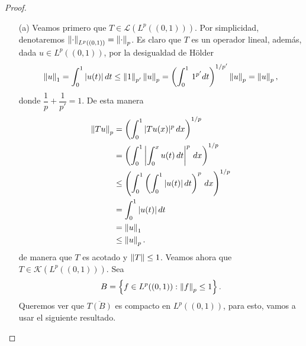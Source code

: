 \begin{proof}
    \begin{enumerate}
        \item[(a)] Veamos primero que $T\in \mathcal{L}(L^p((0,1)))$. Por simplicidad, denotaremos $\left\|\cdot\right\|_{L^p((0,1))}=\left\|\cdot\right\|_p$. Es claro que $T$ es un operador lineal, además, dada $u \in L^p((0,1))$, por la desigualdad de Hölder
        \begin{align*}
            \left\|u\right\|_1=\int_0^1|u(t)|\, dt\leq \left\|1\right\|_{p'}\left\|u\right\|_p=\left(\int_0^1 \, 1^{p'}dt\right)^{1/p'}\left\|u\right\|_p=\left\|u\right\|_p,
        \end{align*}
        donde $\dfrac{1}{p}+\dfrac{1}{p'}=1$. De esta manera
        \begin{align*}
            \left\|Tu\right\|_p&=\left(\int_{0}^1 |Tu(x)|^p\, dx\right)^{1/p}\\
            &=\left(\int_0^1 \left|\int_0^x u(t)\, dt\right|^p\, dx\right)^{1/p}\\
            &\leq \left(\int_{0}^1\left(\int_0^1 |u(t)|\, dt\right)^p\, dx\right)^{1/p}\\
            &=\int_0^1 |u(t)|\, dt\\
            &=\left\|u\right\|_1\\
            &\leq \left\|u\right\|_p.
        \end{align*}
        de manera que $T$ es acotado y $\left\|T\right\|\leq 1$. Veamos ahora que $T \in \mathcal{K}(L^p((0,1)))$. Sea
        \begin{align*}
            B=\left\{f \in L^p((0,1)): \left\|f\right\|_p\leq 1\right\}.
        \end{align*}
        Queremos ver que $\overline{T(B)}$ es compacto en $L^p((0,1))$, para esto, vamos a usar el siguiente resultado.
        


\end{enumerate}
\end{proof}
